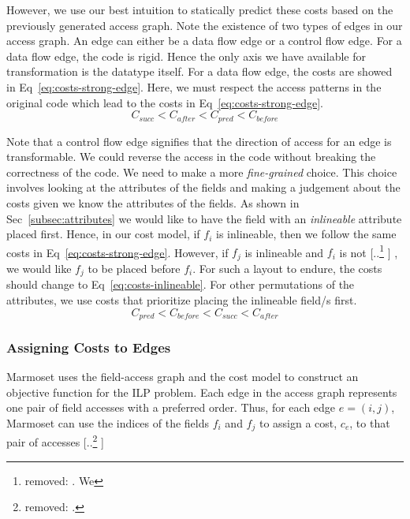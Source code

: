 \documentclass[acmsmall,review,anonymous]{acmart}\settopmatter{printfolios=true,printccs=false,printacmref=false}
\newcommand{\system}{{\sc Marmoset}\xspace}
\providecommand{\DIFaddtex}[1]{{\protect\color{blue} \sf #1}} %
\providecommand{\DIFdeltex}[1]{{\protect\color{red} [..\footnote{removed: #1} ]}} %
\providecommand{\DIFaddbegin}{} %
\providecommand{\DIFaddend}{} %
\providecommand{\DIFdelbegin}{} %
\providecommand{\DIFdelend}{} %
\providecommand{\DIFadd}[1]{\texorpdfstring{\DIFaddtex{#1}}{#1}} %
\providecommand{\DIFdel}[1]{\texorpdfstring{\DIFdeltex{#1}}{}} %
\newcommand{\DIFscaledelfig}{0.5}
\newlength{\DIFdelgraphicswidth} %
\newlength{\DIFdelgraphicsheight} %
\newcommand{\DIFaddincludegraphics}[2][]{{\color{blue}\fbox{\DIFOincludegraphics[#1]{#2}}}} %
\newcommand{\DIFdelincludegraphics}[2][]{%
\sbox{\DIFdelgraphicsbox}{\DIFOincludegraphics[#1]{#2}}%
\settoboxwidth{\DIFdelgraphicswidth}{\DIFdelgraphicsbox} %
\settoboxtotalheight{\DIFdelgraphicsheight}{\DIFdelgraphicsbox} %
\scalebox{\DIFscaledelfig}{%
\parbox[b]{\DIFdelgraphicswidth}{\usebox{\DIFdelgraphicsbox}\\[-\baselineskip] \rule{\DIFdelgraphicswidth}{0em}}\llap{\resizebox{\DIFdelgraphicswidth}{\DIFdelgraphicsheight}{%
\setlength{\unitlength}{\DIFdelgraphicswidth}%
\begin{picture}(1,1)%
\thicklines\linethickness{2pt} %
{\color[rgb]{1,0,0}\put(0,0){\framebox(1,1){}}}%
{\color[rgb]{1,0,0}\put(0,0){\line( 1,1){1}}}%
{\color[rgb]{1,0,0}\put(0,1){\line(1,-1){1}}}%
\end{picture}%
}\hspace*{3pt}}} %
} %
\DeclareRobustCommand{\DIFaddbegin}{\DIFOaddbegin \let\includegraphics\DIFaddincludegraphics} %
\DeclareRobustCommand{\DIFaddend}{\DIFOaddend \let\includegraphics\DIFOincludegraphics} %
\DeclareRobustCommand{\DIFdelbegin}{\DIFOdelbegin \let\includegraphics\DIFdelincludegraphics} %
\DeclareRobustCommand{\DIFdelend}{\DIFOaddend \let\includegraphics\DIFOincludegraphics} %
\begin{document}
However, we use our best intuition to statically predict these costs based on the previously generated access graph.
Note the existence of two types of edges in our access graph. An edge can either be a data flow edge or a control flow edge.
For a data flow edge, the code is rigid. Hence the only axis we have available for transformation is the datatype itself. For a data flow edge, the costs are showed in Eq~\ref{eq:costs-strong-edge}. Here, we must respect the access patterns in the original code which lead to the costs in Eq~\ref{eq:costs-strong-edge}.
\begin{equation}
C_{\mathit{succ}} < C_\mathit{after} < C_\mathit{pred} < C_\mathit{before}
\label{eq:costs-strong-edge}
\end{equation}

Note that a control flow edge signifies that the direction of access for an edge is transformable. We could reverse the access in the code without breaking the correctness of the code. We need to make a more \textit{fine-grained} choice.
This choice involves looking at the attributes of the fields and making a judgement about the costs given we know the attributes of the fields. As shown in Sec~\ref{subsec:attributes} we would like to have the field with an \textit{inlineable} attribute placed first.
Hence, in our cost model, if $f_i$ is inlineable, then we follow the same costs in Eq~\ref{eq:costs-strong-edge}. However, if $f_j$ is inlineable and $f_i$ is not\DIFdelbegin \DIFdel{. We }\DIFdelend \DIFaddbegin \DIFadd{, we }\DIFaddend would like $f_j$ to be placed before $f_i$. For such a layout to endure, the costs should change to Eq~\ref{eq:costs-inlineable}.
For other permutations of the attributes, we use costs that prioritize placing the inlineable field/s first. 
\begin{equation}
C_\mathit{pred} < C_\mathit{before} < C_{\mathit{succ}} < C_\mathit{after}
\label{eq:costs-inlineable}
\end{equation}


\subsubsection{Assigning Costs to Edges}

\system uses the field-access graph and the cost model to construct an objective function for the ILP \DIFaddbegin \DIFadd{problem}\DIFaddend .
Each edge in the access graph represents one pair of field accesses with a preferred order. Thus, for each edge $e = (i, j)$, \system can use the indices of the fields $f_i$ and $f_j$ to assign a cost, $c_e$, to that pair of accesses \DIFdelbegin \DIFdel{.
}%
\end{document}
